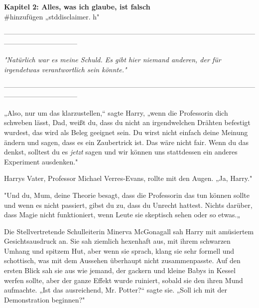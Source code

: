 

\hypertarget{alles-was-ich-glaube-ist-falsch}{%

\textbf{Kapitel 2: Alles, was ich glaube, ist falsch}\\

\hfill\break \#hinzufügen „stddisclaimer. h"

--------------------------------------------------------------------------------------------------------------------------------------------

\hfill\break

\emph{"Natürlich war es meine Schuld. Es gibt hier niemand anderen, der für irgendetwas verantwortlich sein könnte."}

\hfill\break

--------------------------------------------------------------------------------------------------------------------------------------------

\hfill\break „Also, nur um das klarzustellen,“ sagte Harry, „wenn die Professorin dich schweben lässt, Dad, weißt du, dass du nicht an irgendwelchen Drähten befestigt wurdest, das wird als Beleg geeignet sein. Du wirst nicht einfach deine Meinung ändern und sagen, dass es ein Zaubertrick ist. Das wäre nicht fair. Wenn du das denkst, solltest du es \emph{jetzt} sagen und wir können uns stattdessen ein anderes Experiment ausdenken."

Harrys Vater, Professor Michael Verres-Evans, rollte mit den Augen. „Ja, Harry."

"Und du, Mum, deine Theorie besagt, dass die Professorin das tun können sollte und wenn es nicht passiert, gibst du zu, dass du Unrecht hattest. Nichts darüber, dass Magie nicht funktioniert, wenn Leute sie skeptisch sehen oder so etwas.„

Die Stellvertretende Schulleiterin Minerva McGonagall sah Harry mit amüsiertem Gesichtsausdruck an. Sie sah ziemlich hexenhaft aus, mit ihrem schwarzen Umhang und spitzem Hut, aber wenn sie sprach, klang sie sehr formell und schottisch, was mit dem Aussehen überhaupt nicht zusammenpasste. Auf den ersten Blick sah sie aus wie jemand, der gackern und kleine Babys in Kessel werfen sollte, aber der ganze Effekt wurde ruiniert, sobald sie den ihren Mund aufmachte. „Ist das ausreichend, Mr. Potter?“ sagte sie. „Soll ich mit der Demonstration beginnen?"

}
